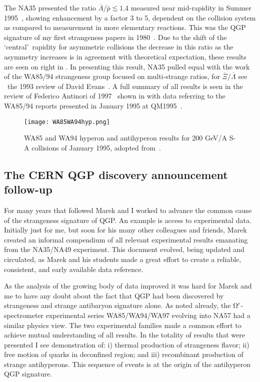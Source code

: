 \documentclass{appolb}
\begin{document}
The NA35 presented the ratio $ \overline{\Lambda}/ \bar p\lesssim 1.4$ measured near mid-rapidity in Summer 1995~\cite{Alber:1996mq}, showing enhancement by a factor 3 to 5, dependent on the collision system as compared to measurement in more elementary reactions. This was the QGP signature of my first strangeness papers in 1980~\cite{Rafelski:1980fy}. Due to the shift of the \lq central\rq\ rapidity for asymmetric collisions the decrease in this ratio as the asymmetry increases is in agreement with theoretical expectation, these results are seen on right in . In presenting this result, NA35 pulled equal with the work of the  WA85/94 strangeness group focused on multi-strange ratios, for $ \overline{\Xi}/\overline{\Lambda}$ see \eg\ the 1993 review of David Evans~\cite{Evans:1994sg}. A full summary of all results is seen in the review of Federico Antinori of 1997~\cite{Antinori:1997nn} shown in  with data referring to the WA85/94 reports presented in January 1995 at QM1995~\cite{DiBari:1995cy,Kinson:1995cz}. 

\begin{figure}[bht]
\centerline{%
\texttt{[image: WA85WA94hyp.png]}}
\caption{WA85 and WA94 hyperon and antihyperon results for 200 GeV/A S-A collisions of January 1995, adopted from~\cite{Antinori:1997nn}. }
\label{WA85WA94AntiHFig}
\end{figure}

\subsection{The CERN QGP discovery announcement follow-up}\label{ssec:CERNQGP}
For many years that followed Marek and I worked to advance the common cause of the strangeness signature of QGP. An example is access to experimental data. Initially just for me, but soon for his many other colleagues and friends, Marek created an informal compendium of all relevant experimental results emanating from the NA35/NA49 experiment. This document evolved, being updated and circulated, as Marek and his students made a great effort to create a reliable, consistent, and early available data reference. 

As the analysis of the growing body of data improved it was hard for Marek and me to have any doubt about the fact that QGP had been discovered by strangeness and strange antibaryon signature alone. As noted already, the $\Omega\rq$-spectrometer experimental series WA85/WA94/WA97 evolving into NA57 had a similar physics view. The two experimental families made a common effort to achieve mutual understanding of all results. In the totality of results that were presented I see demonstration of: i) thermal production of strangeness flavor; ii) free motion of quarks in deconfined region; and iii) recombinant production of strange antihyperons. This sequence of events is at the origin of the antihyperon QGP signature.
\end{document}
